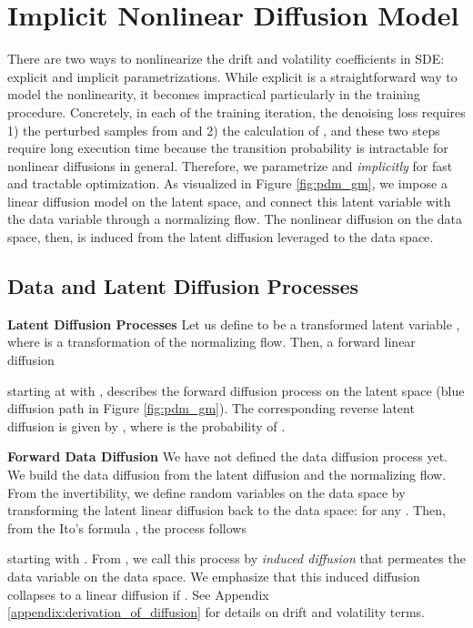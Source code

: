 \documentclass{article}
\makeatletter
\theoremstyle{definition}
\theoremstyle{remark}
\newcommand{\leqnomode}{\tagsleft@true}\newcommand{\reqnomode}{\tagsleft@false}
\makeatother
\begin{document}
	\leqnomode
	
	\section{Implicit Nonlinear Diffusion Model}\label{sec:methodology}
	
	There are two ways to nonlinearize the drift and volatility coefficients in SDE: explicit and implicit parametrizations. While explicit is a straightforward way to model the nonlinearity, it becomes impractical particularly in the training procedure. Concretely, in each of the training iteration, the denoising loss  requires 1) the perturbed samples  from  and 2) the calculation of , and these two steps require long execution time because the transition probability  is intractable for nonlinear diffusions in general. Therefore, we parametrize  and  \textit{implicitly} for fast and tractable optimization. As visualized in Figure \ref{fig:pdm_gm}, we impose a linear diffusion model on the latent space, and connect this latent variable with the data variable through a normalizing flow. The nonlinear diffusion on the data space, then, is induced from the latent diffusion leveraged to the data space.
	
	\subsection{Data and Latent Diffusion Processes}
	
	\textbf{Latent Diffusion Processes} Let us define  to be a transformed latent variable , where  is a transformation of the normalizing flow. Then, a forward linear diffusion
	
	starting at  with , describes the forward diffusion process on the latent space (blue diffusion path in Figure \ref{fig:pdm_gm}). The corresponding reverse latent diffusion is given by , where  is the probability of .
	
	\textbf{Forward Data Diffusion} We have not defined the data diffusion process yet. We build the data diffusion from the latent diffusion and the normalizing flow. From the invertibility, we define random variables on the data space by transforming the latent linear diffusion back to the data space:  for any . Then, from the Ito's formula \citep{oksendal2013stochastic}, the process  follows

starting with . From , we call this process by \textit{induced diffusion} that permeates the data variable on the data space. We emphasize that this induced diffusion collapses to a linear diffusion if . See Appendix \ref{appendix:derivation_of_diffusion} for details on drift and volatility terms.
\end{document}
